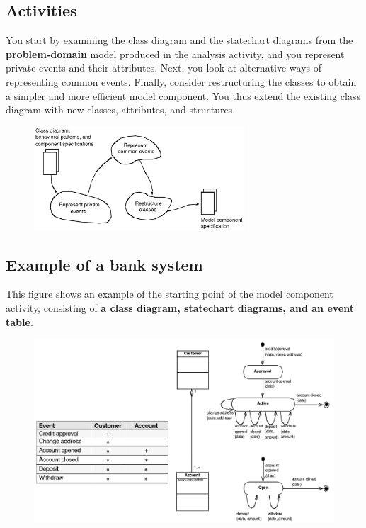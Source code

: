 \subsection{Activities}
You start by examining the class diagram and the statechart diagrams from the \textbf{problem-domain} model produced in the analysis activity, and you represent private events and their attributes.
Next, you look at alternative ways of representing common events. Finally, consider restructuring the classes to obtain a simpler and more efficient model component. You thus extend the existing class diagram with new classes, attributes, and structures.

\begin{figure}[H]
    \centering
    \includegraphics[width=0.7\textwidth]{figures/modelcomponentactivities.png}
\end{figure}

\subsection{Example of a bank system}\label{modelcomponents:bankexample}
This figure shows an example of the starting point of the model component activity, consisting of \textbf{a class diagram, statechart diagrams, and an event table}.
\begin{figure}[H]
    \centering
    \includegraphics[width=\textwidth]{figures/modelcomponentbankexample.png}
\end{figure}

